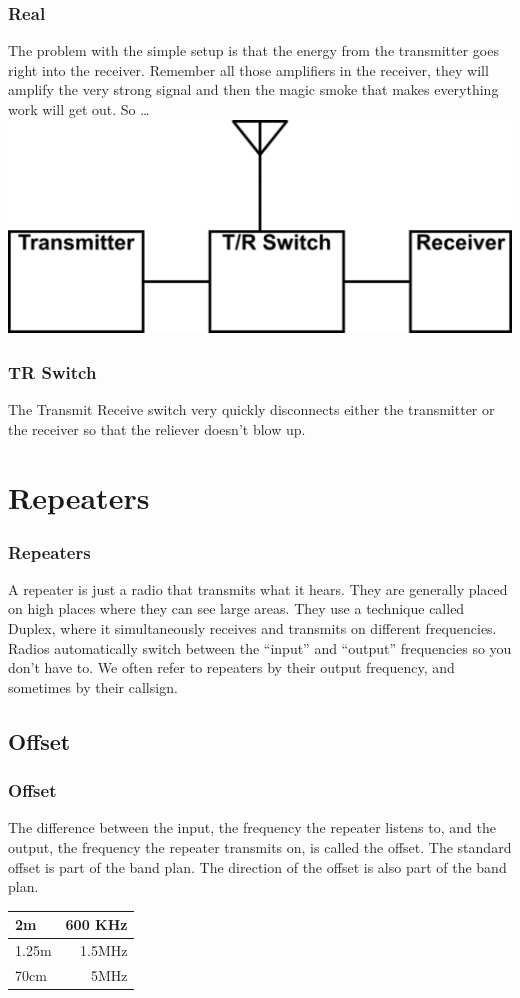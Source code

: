 \documentclass[10pt]{beamer}
\begin{document}
\begin{frame}
\frametitle{Real}
The problem with the simple setup is that the energy from the transmitter goes right into the receiver. Remember all those amplifiers in the receiver, they will amplify the very strong signal and then the magic smoke that makes everything work will get out. So \ldots
\includegraphics[width=.8\textwidth]{simpletrworks.png}
\end{frame}

\begin{frame}
\frametitle{TR Switch}
The Transmit Receive switch very quickly disconnects either the transmitter or the receiver so that the reliever doesn't blow up.
\end{frame}

\section{Repeaters}

\begin{frame}
\frametitle{Repeaters}
A repeater is just a radio that transmits what it hears. They are generally placed on high places where they can see large areas. They use a technique called Duplex, where it simultaneously receives and transmits on different frequencies. Radios automatically switch between the ``input'' and ``output'' frequencies so you don't have to. We often refer to repeaters by their output frequency, and sometimes by their callsign.
\end{frame}

\subsection{Offset}

\begin{frame}
\frametitle{Offset}
The difference between the input, the frequency the repeater listens to, and the output, the frequency the repeater transmits on, is called the offset. The standard offset is part of the band plan. The direction of the offset is also part of the band plan.\\

\begin{tabular}{|l|r|}
\hline
2m & 600 KHz\\ \hline
1.25m & 1.5MHz \\ \hline
70cm & 5MHz \\
\hline
\end{tabular}

\end{frame}
\end{document}
